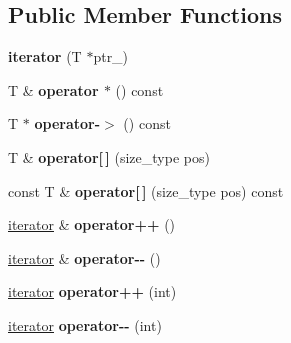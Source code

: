\subsection*{Public Member Functions}
\begin{DoxyCompactItemize}
\item 
\mbox{\label{classprevector_1_1iterator_ae9dd2b5e8d96f866e4b05d6b7535f285}} 
{\bfseries iterator} (T $\ast$ptr\+\_\+)
\item 
\mbox{\label{classprevector_1_1iterator_a2a007f4fc12c029f38ebd427d23cc9eb}} 
T \& {\bfseries operator $\ast$} () const
\item 
\mbox{\label{classprevector_1_1iterator_a2d71176663fdf1736d59419d8016b652}} 
T $\ast$ {\bfseries operator-\/$>$} () const
\item 
\mbox{\label{classprevector_1_1iterator_ad2061d89001f5888618c29cf2f82ceae}} 
T \& {\bfseries operator\mbox{[}$\,$\mbox{]}} (size\+\_\+type pos)
\item 
\mbox{\label{classprevector_1_1iterator_a2b51fedc4baf3c4bbb82d23d31d13ef3}} 
const T \& {\bfseries operator\mbox{[}$\,$\mbox{]}} (size\+\_\+type pos) const
\item 
\mbox{\label{classprevector_1_1iterator_a7459dca1c7cead188e6b13700bbfedea}} 
\mbox{\hyperlink{classprevector_1_1iterator}{iterator}} \& {\bfseries operator++} ()
\item 
\mbox{\label{classprevector_1_1iterator_a5ae1b7e4536071159b91cc82f8aacdfc}} 
\mbox{\hyperlink{classprevector_1_1iterator}{iterator}} \& {\bfseries operator-\/-\/} ()
\item 
\mbox{\label{classprevector_1_1iterator_abb10e5e7efcae2bf8db70acbf0d081cd}} 
\mbox{\hyperlink{classprevector_1_1iterator}{iterator}} {\bfseries operator++} (int)
\item 
\mbox{\label{classprevector_1_1iterator_a55784772609ec1dd13b8b4fa6f11ac82}} 
\mbox{\hyperlink{classprevector_1_1iterator}{iterator}} {\bfseries operator-\/-\/} (int)

\end{DoxyCompactItemize}
